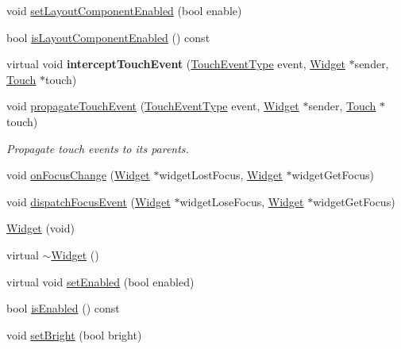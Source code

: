 \begin{DoxyCompactItemize}
\item 
void \hyperlink{classui_1_1Widget_a28a78caf974c170fce6ef1742d517fae}{set\+Layout\+Component\+Enabled} (bool enable)
\item 
bool \hyperlink{classui_1_1Widget_ab7dd215ebc30a43a24f441063bbc3fea}{is\+Layout\+Component\+Enabled} () const
\item 
\mbox{\label{classui_1_1Widget_a428c2aa661da33fb9d7bfc1659b164c0}} 
virtual void {\bfseries intercept\+Touch\+Event} (\hyperlink{classui_1_1Widget_a4829c0f1cbaf1fd820a9b2ccf0c58c73}{Touch\+Event\+Type} event, \hyperlink{classui_1_1Widget}{Widget} $\ast$sender, \hyperlink{classTouch}{Touch} $\ast$touch)
\item 
\mbox{\label{classui_1_1Widget_abd3ef28c29bd9526e2d1373c85542c32}} 
void \hyperlink{classui_1_1Widget_abd3ef28c29bd9526e2d1373c85542c32}{propagate\+Touch\+Event} (\hyperlink{classui_1_1Widget_a4829c0f1cbaf1fd820a9b2ccf0c58c73}{Touch\+Event\+Type} event, \hyperlink{classui_1_1Widget}{Widget} $\ast$sender, \hyperlink{classTouch}{Touch} $\ast$touch)
\begin{DoxyCompactList}\small\item\em Propagate touch events to its parents. \end{DoxyCompactList}\item 
void \hyperlink{classui_1_1Widget_a316bfe5fc7d6bd1ebab461af4b79f967}{on\+Focus\+Change} (\hyperlink{classui_1_1Widget}{Widget} $\ast$widget\+Lost\+Focus, \hyperlink{classui_1_1Widget}{Widget} $\ast$widget\+Get\+Focus)
\item 
void \hyperlink{classui_1_1Widget_ae54dd6bc70002d784f9b04fd7ccc057c}{dispatch\+Focus\+Event} (\hyperlink{classui_1_1Widget}{Widget} $\ast$widget\+Lose\+Focus, \hyperlink{classui_1_1Widget}{Widget} $\ast$widget\+Get\+Focus)
\item 
\hyperlink{classui_1_1Widget_a57287568cdb4b8e94303535c2d9cf892}{Widget} (void)
\item 
virtual \hyperlink{classui_1_1Widget_a3c972f87a8311912094924be09218e26}{$\sim$\+Widget} ()
\item 
virtual void \hyperlink{classui_1_1Widget_a0d06681b8d0275c0e52e887c8bf2a8c6}{set\+Enabled} (bool enabled)
\item 
bool \hyperlink{classui_1_1Widget_a483d1547b7786c8a8da795f1f2ca1342}{is\+Enabled} () const
\item 
void \hyperlink{classui_1_1Widget_a70d4eaf022be75ac84d09782f4a68e76}{set\+Bright} (bool bright)

\end{DoxyCompactItemize}
